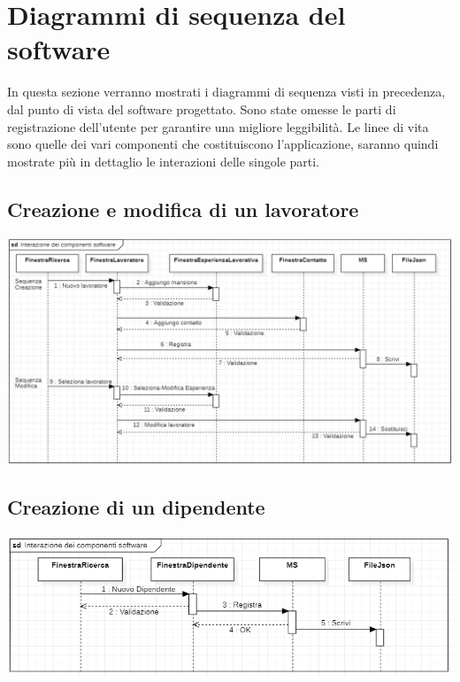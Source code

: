 \documentclass[ 4paper,11pt,openany]{book}
\begin{document}
\section{Diagrammi di sequenza del software}
In questa sezione verranno mostrati i diagrammi di sequenza visti in precedenza, dal punto di vista del software progettato. Sono state omesse le parti di registrazione dell'utente per garantire una migliore leggibilità. Le linee di vita sono quelle dei vari componenti che costituiscono l'applicazione, saranno quindi mostrate più in dettaglio le interazioni delle singole parti.
\subsection{Creazione e modifica di un lavoratore}
\includegraphics[width=180mm]{softwareseq.png}
\subsection{Creazione di un dipendente}
\includegraphics[width=180mm]{softwareseq2.png}
\end{document}
